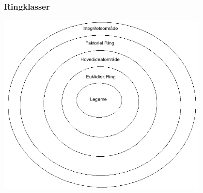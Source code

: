 \subsubsection{Ringklasser}
\label{Ringklasser}
\includegraphics[width=0.8\textwidth]{img/ring_classes}











